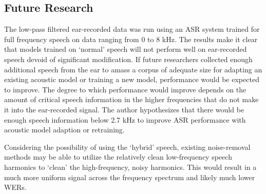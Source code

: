 % 

\subsection{Future Research}
\label{chap4:future-research}

The low-pass filtered ear-recorded data was run using an ASR system trained for full frequency speech on data ranging from 0 to 8 kHz.  The results make it clear that models trained on `normal' speech will not perform well on ear-recorded speech devoid of significant modification.  If future researchers collected enough additional speech from the ear to amass a corpus of adequate size for adapting an existing acoustic model or training a new model, performance would be expected to improve.  The degree to which performance would improve depends on the amount of critical speech information in the higher frequencies that do not make it into the ear-recorded signal.  The author hypothesizes that there would be enough speech information below 2.7 kHz to improve ASR performance with acoustic model adaption or retraining.

Considering the possibility of using the `hybrid' speech, existing noise-removal methods may be able to utilize the relatively clean low-frequency speech harmonics to `clean' the high-frequency, noisy harmonics.  This would result in a much more uniform signal across the frequency spectrum and likely much lower WERs.

